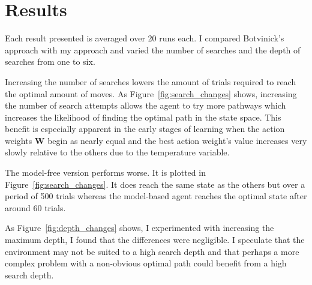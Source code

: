 \section{Results}
Each result presented is averaged over 20 runs each. I compared Botvinick's approach with my approach and varied the number of searches and the depth of searches from one to six.

Increasing the number of searches lowers the amount of trials required to reach the optimal amount of moves. As Figure~\ref{fig:search_changes} shows, increasing the number of search attempts allows the agent to try more pathways which increases the likelihood of finding the optimal path in the state space. This benefit is especially apparent in the early stages of learning when the action weights \textbf{W} begin as nearly equal and the best action weight's value increases very slowly relative to the others due to the temperature variable.

The model-free version performs worse. It is plotted in Figure~\ref{fig:search_changes}. It does reach the same state as the others but over a period of 500 trials whereas the model-based agent reaches the optimal state after around 60 trials.

As Figure~\ref{fig:depth_changes} shows, I experimented with increasing the maximum depth, I found that the differences were negligible. I speculate that the environment may not be suited to a high search depth and that perhaps a more complex problem with a non-obvious optimal path could benefit from a high search depth.





